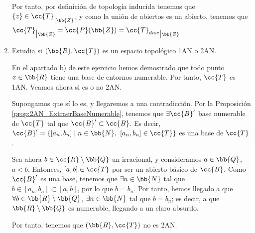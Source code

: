 \begin{ejercicio}
\begin{enumerate}[label=\alph*)]
        Por tanto, por definición de topología inducida tenemos que $\{z\}\in \cc{T}_{\big | \bb{Z}}$, y como la unión de abiertos es un abierto, tenemos que $\cc{T}_{\big | \bb{Z}}=\cc{P}(\bb{Z})={\cc{T}_{disc}}_{\big| \bb{Z}}$.

        \item Estudia si $(\bb{R}, \cc{T})$ es un espacio topológico 1AN o 2AN.

        En el apartado b) de este ejercicio hemos demostrado que todo punto $x\in \bb{R}$ tiene una base de entornos numerable. Por tanto, $\cc{T}$ es 1AN. Veamos ahora si es o no 2AN.

        Supongamos que sí lo es, y llegaremos a una contradicción. Por la Proposición \ref{prop:2AN_ExtraerBaseNumerable}, tenemos que $\exists \cc{B}'$ base numerable de $\cc{T}$ tal que $\cc{B}'\subset \cc{B}$. Es decir, $\cc{B}'=\{[a_n,b_n]\mid n\in \bb{N},~[a_n,b_n]\in \cc{T}\}$ es una base de $\cc{T}$.

        Sea ahora $b\in \cc{R}\setminus \bb{Q}$ un irracional, y consideramos $a\in \bb{Q}$, $a<b$. Entonces, $[a,b]\in \cc{T}$ por ser un abierto básico de $\cc{B}$. Como $\cc{B}'$ es una base, tenemos que $\exists n\in \bb{N}$ tal que $b\in [a_n, b_n]\subset [a,b]$, por lo que $b=b_n$. Por tanto, hemos llegado a que $\forall b\in \bb{R}\setminus \bb{Q}$, $\exists n\in \bb{N}$ tal que $b=b_n$; es decir, a que $\bb{R}\setminus \bb{Q}$ es numerable, llegando a un claro absurdo.

        Por tanto, tenemos que $(\bb{R}, \cc{T})$ no es 2AN.
    \end{enumerate}
\end{ejercicio}